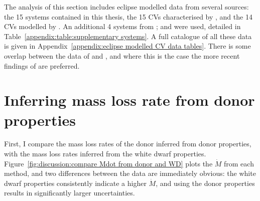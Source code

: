 \label{chpt:discussion} %

The analysis of this section includes eclipse modelled data from several sources: the 15 systems contained in this thesis, the 15 CVs characterised by \citet{McAllister2019}, and the 14 CVs modelled by \citet{Savoury2011}. An additional 4 systems from \citet{mcallister2015,mcallister2017, mcallister2017b}; and \citet{copperwheat2010} were used, detailed in Table~\ref{appendix:table:supplementary systems}. A full catalogue of all these data is given in Appendix~\ref{appendix:eclipse modelled CV data tables}.
There is some overlap between the data of \citet{McAllister2019} and \citet{Savoury2011}, and where this is the case the more recent findings of \citet{McAllister2019} are preferred.




\section{Inferring mass loss rate from donor properties}
\label{sect:discussion:evolutionary modelling}

First, I compare the mass loss rates of the donor inferred from donor properties, with the mass loss rates inferred from the white dwarf properties. Figure~\ref{fig:discussion:compare Mdot from donor and WD} plots the $\dot M$ from each method, and two differences between the data are immediately obvious: the white dwarf properties consistently indicate a higher $\dot M$, and using the donor properties results in significantly larger uncertainties.

